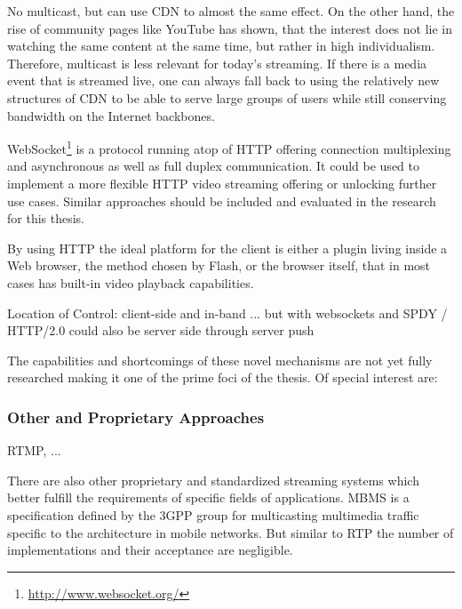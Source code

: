 No multicast, but can use CDN to almost the same effect.
	On the other hand, the rise of community pages like YouTube has shown, that the interest does not lie in watching the same content at the same time, but rather in high individualism. Therefore, multicast is less relevant for today's streaming. If there is a media event that is streamed live, one can always fall back to using the relatively new structures of \gls{CDN} to be able to serve large groups of users while still conserving bandwidth on the Internet backbones.


WebSocket\footnote{\url{http://www.websocket.org/}} \cite{ietf2011websocket} is a protocol running atop of \gls{HTTP} offering connection multiplexing and asynchronous as well as full duplex communication. It could be used to implement a more flexible \gls{HTTP} video streaming offering or unlocking further use cases. Similar approaches should be included and evaluated in the research for this thesis.

By using \gls{HTTP} the ideal platform for the client is either a plugin living inside a Web browser, the method chosen by Flash, or the browser itself, that in most cases has built-in video playback capabilities.

Location of Control: client-side and in-band ... but with websockets and SPDY / HTTP/2.0 could also be server side through server push

The capabilities and shortcomings of these novel mechanisms are not yet fully researched making it one of the prime foci of the thesis. Of special interest are:







\subsubsection{Other and Proprietary Approaches}

RTMP, ...

There are also other proprietary and standardized streaming systems which better fulfill the requirements of specific fields of applications. \gls{MBMS} \cite{3gpp22.146,3gpp22.246} is a specification defined by the 3GPP group for multicasting multimedia traffic specific to the architecture in mobile networks. But similar to \gls{RTP} the number of implementations and their acceptance are negligible.

